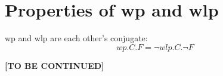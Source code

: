 \section{Properties of wp and wlp}
wp and wlp are each other's conjugate: 
\[wp.C.F = \neg wlp.C.\neg F\]



\textbf{[TO BE CONTINUED]}


